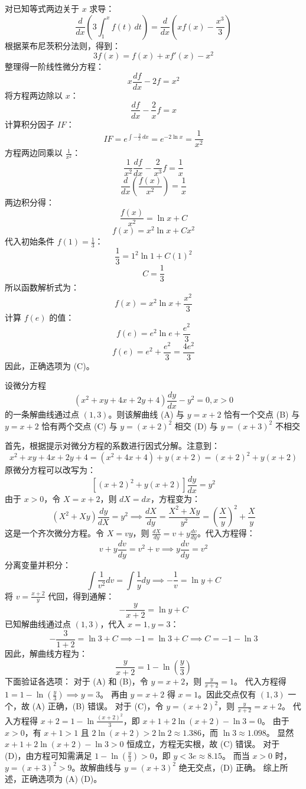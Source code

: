\begin{questions}
\begin{solution}
对已知等式两边关于 $x$ 求导：
\[
\frac{d}{dx} \left( 3 \int_{1}^{x} f(t) \,dt \right) = \frac{d}{dx} \left( x f(x) - \frac{x^3}{3} \right)
\]
根据莱布尼茨积分法则，得到：
\[
3 f(x) = f(x) + x f'(x) - x^2
\]
整理得一阶线性微分方程：
\[
x \frac{df}{dx} - 2f = x^2
\]
将方程两边除以 $x$：
\[
\frac{df}{dx} - \frac{2}{x} f = x
\]
计算积分因子 $IF$：
\[
IF = e^{\int -\frac{2}{x} \,dx} = e^{-2 \ln x} = \frac{1}{x^2}
\]
方程两边同乘以 $\frac{1}{x^2}$：
\[
\frac{1}{x^2} \frac{df}{dx} - \frac{2}{x^3} f = \frac{1}{x}
\]
\[
\frac{d}{dx} \left( \frac{f(x)}{x^2} \right) = \frac{1}{x}
\]
两边积分得：
\[
\frac{f(x)}{x^2} = \ln x + C
\]
\[
f(x) = x^2 \ln x + C x^2
\]
代入初始条件 $f(1) = \frac{1}{3}$：
\[
\frac{1}{3} = 1^2 \ln 1 + C(1)^2
\]
\[
C = \frac{1}{3}
\]
所以函数解析式为：
\[
f(x) = x^2 \ln x + \frac{x^2}{3}
\]
计算 $f(e)$ 的值：
\[
f(e) = e^2 \ln e + \frac{e^2}{3}
\]
\[
f(e) = e^2 + \frac{e^2}{3} = \frac{4e^2}{3}
\]
因此，正确选项为 (C)。
\end{solution}

\question 设微分方程
\[
(x^2 + xy + 4x + 2y + 4)\frac{dy}{dx} - y^2 = 0, x > 0
\]
的一条解曲线通过点 $(1, 3)$。则该解曲线
(A) 与 $y = x + 2$ 恰有一个交点
(B) 与 $y = x + 2$ 恰有两个交点
(C) 与 $y = (x + 2)^2$ 相交
(D) 与 $y = (x + 3)^2$ 不相交

\begin{solution}
首先，根据提示对微分方程的系数进行因式分解。注意到：
\[
x^2 + xy + 4x + 2y + 4 = (x^2 + 4x + 4) + y(x + 2) = (x + 2)^2 + y(x + 2)
\]
原微分方程可以改写为：
\[
\left[ (x + 2)^2 + y(x + 2) \right] \frac{dy}{dx} = y^2
\]
由于 $x > 0$，令 $X = x + 2$，则 $dX = dx$，方程变为：
\[
(X^2 + Xy) \frac{dy}{dX} = y^2 \implies \frac{dX}{dy} = \frac{X^2 + Xy}{y^2} = \left( \frac{X}{y} \right)^2 + \frac{X}{y}
\]
这是一个齐次微分方程。令 $X = vy$，则 $\frac{dX}{dy} = v + y\frac{dv}{dy}$。代入方程得：
\[
v + y\frac{dv}{dy} = v^2 + v \implies y\frac{dv}{dy} = v^2
\]
分离变量并积分：
\[
\int \frac{1}{v^2} dv = \int \frac{1}{y} dy \implies -\frac{1}{v} = \ln y + C
\]
将 $v = \frac{x + 2}{y}$ 代回，得到通解：
\[
-\frac{y}{x + 2} = \ln y + C
\]
已知解曲线通过点 $(1, 3)$，代入 $x = 1, y = 3$：
\[
-\frac{3}{1 + 2} = \ln 3 + C \implies -1 = \ln 3 + C \implies C = -1 - \ln 3
\]
因此，解曲线方程为：
\[
\frac{y}{x + 2} = 1 - \ln \left( \frac{y}{3} \right)
\]
下面验证各选项：
对于 (A) 和 (B)，令 $y = x + 2$，则 $\frac{y}{x + 2} = 1$。
代入方程得 $1 = 1 - \ln \left( \frac{y}{3} \right) \implies y = 3$。
再由 $y = x + 2$ 得 $x = 1$。因此交点仅有 $(1, 3)$ 一个，故 (A) 正确，(B) 错误。
对于 (C)，令 $y = (x + 2)^2$，则 $\frac{y}{x + 2} = x + 2$。
代入方程得 $x + 2 = 1 - \ln \frac{(x + 2)^2}{3}$，即 $x + 1 + 2\ln(x + 2) - \ln 3 = 0$。
由于 $x > 0$，有 $x + 1 > 1$ 且 $2\ln(x + 2) > 2\ln 2 \approx 1.386$，而 $\ln 3 \approx 1.098$。
显然 $x + 1 + 2\ln(x + 2) - \ln 3 > 0$ 恒成立，方程无实根，故 (C) 错误。
对于 (D)，由方程可知需满足 $1 - \ln \left( \frac{y}{3} \right) > 0$，即 $y < 3e \approx 8.15$。
而当 $x > 0$ 时，$y = (x + 3)^2 > 9$。故解曲线与 $y = (x + 3)^2$ 绝无交点，(D) 正确。
综上所述，正确选项为 (A) (D)。
\end{solution}



\end{questions}
